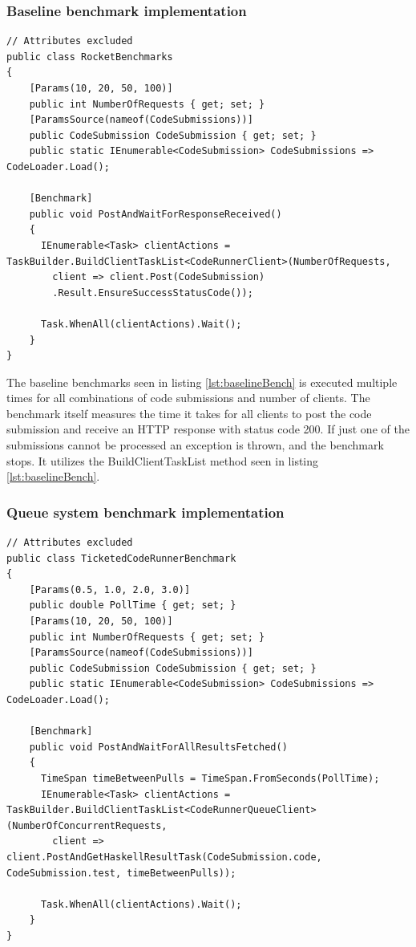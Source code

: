 \subsubsection{Baseline benchmark implementation}
\begin{lstlisting}[language=CSharp, escapechar=~, caption={C\# code showing the implementation of the benchmark for the baseline}, label={lst:baselineBench}]
// Attributes excluded
public class RocketBenchmarks
{
    [Params(10, 20, 50, 100)] 
    public int NumberOfRequests { get; set; }
    [ParamsSource(nameof(CodeSubmissions))]
    public CodeSubmission CodeSubmission { get; set; }
    public static IEnumerable<CodeSubmission> CodeSubmissions => CodeLoader.Load();

    [Benchmark]
    public void PostAndWaitForResponseReceived()
    {
      IEnumerable<Task> clientActions = TaskBuilder.BuildClientTaskList<CodeRunnerClient>(NumberOfRequests,
        client => client.Post(CodeSubmission)
        .Result.EnsureSuccessStatusCode());
        
      Task.WhenAll(clientActions).Wait();
    }
}
\end{lstlisting}
The baseline benchmarks seen in listing \ref{lst:baselineBench} is executed multiple times for all combinations of code submissions and number of clients.
The benchmark itself measures the time it takes for all clients to post the code submission and receive an HTTP response with status code 200.
If just one of the submissions cannot be processed an exception is thrown, and the benchmark stops.
It utilizes the BuildClientTaskList method seen in listing \ref{lst:baselineBench}.

\subsubsection{Queue system benchmark implementation}
\begin{lstlisting}[language=CSharp, escapechar=~, caption={C\# code showing the implementation of the benchmark for the backend with the Queue System }, label={lst:queueSystemBench}]
// Attributes excluded
public class TicketedCodeRunnerBenchmark
{
    [Params(0.5, 1.0, 2.0, 3.0)] 
    public double PollTime { get; set; }
    [Params(10, 20, 50, 100)] 
    public int NumberOfRequests { get; set; }
    [ParamsSource(nameof(CodeSubmissions))] 
    public CodeSubmission CodeSubmission { get; set; }
    public static IEnumerable<CodeSubmission> CodeSubmissions => CodeLoader.Load();

    [Benchmark]
    public void PostAndWaitForAllResultsFetched()
    {
      TimeSpan timeBetweenPulls = TimeSpan.FromSeconds(PollTime);
      IEnumerable<Task> clientActions = TaskBuilder.BuildClientTaskList<CodeRunnerQueueClient>(NumberOfConcurrentRequests, 
        client => client.PostAndGetHaskellResultTask(CodeSubmission.code, CodeSubmission.test, timeBetweenPulls));

      Task.WhenAll(clientActions).Wait();
    }
}
\end{lstlisting}

